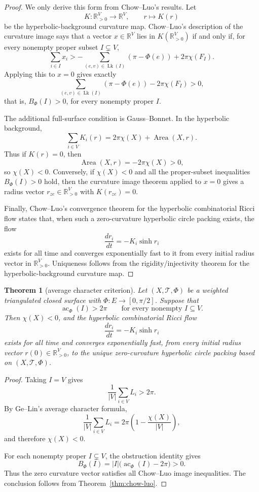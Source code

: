 \documentclass[11pt]{article}
\newtheorem{theorem}{Theorem}
\newcommand{\T}{\mathcal T}
\newcommand{\Phiw}{\Phi}
\newcommand{\R}{\mathbb R}
\newcommand{\Lk}{\operatorname{Lk}}
\newcommand{\ac}{\operatorname{ac}}
\begin{document}
\begin{proof}
We only derive this form from Chow--Luo's results.  Let
\[
  K:\R_{>0}^V\longrightarrow \R^V,\qquad r\longmapsto K(r)
\]
be the hyperbolic-background curvature map.  Chow--Luo's description of
the curvature image says that a vector $x\in\R^V$ lies in $K(\R_{>0}^V)$
if and only if, for every nonempty proper subset $I\subsetneq V$,
\[
  \sum_{i\in I}x_i
  >
  -\sum_{(e,v)\in\Lk(I)}(\pi-\Phiw(e))+2\pi\chi(F_I).
\]
Applying this to $x=0$ gives exactly
\[
  \sum_{(e,v)\in\Lk(I)}(\pi-\Phiw(e))-2\pi\chi(F_I)>0,
\]
that is, $B_\Phi(I)>0$, for every nonempty proper $I$.

The additional full-surface condition is Gauss--Bonnet.  In the hyperbolic
background,
\[
  \sum_{i\in V}K_i(r)=2\pi\chi(X)+\operatorname{Area}(X,r).
\]
Thus if $K(r)=0$, then
\[
  \operatorname{Area}(X,r)=-2\pi\chi(X)>0,
\]
so $\chi(X)<0$.  Conversely, if $\chi(X)<0$ and all the proper-subset
inequalities $B_\Phi(I)>0$ hold, then the curvature image theorem applied
to $x=0$ gives a radius vector $r_{ze}\in\R_{>0}^V$ with $K(r_{ze})=0$.

Finally, Chow--Luo's convergence theorem for the hyperbolic combinatorial
Ricci flow states that, when such a zero-curvature hyperbolic circle
packing exists, the flow
\[
  \frac{dr_i}{dt}=-K_i\sinh r_i
\]
exists for all time and converges exponentially fast to it from every
initial radius vector in $\R_{>0}^V$.  Uniqueness follows from the
rigidity/injectivity theorem for the hyperbolic-background curvature map.
\end{proof}

\begin{theorem}[average character criterion]
Let $(X,\T,\Phiw)$ be a weighted triangulated closed surface with
$\Phiw:E\to[0,\pi/2]$.  Suppose that
\[
  \ac_\Phi(I)>2\pi
  \qquad
  \text{for every nonempty } I\subseteq V .
\]
Then $\chi(X)<0$, and the hyperbolic combinatorial Ricci flow
\[
  \frac{dr_i}{dt}=-K_i\sinh r_i
\]
exists for all time and converges exponentially fast, from every initial
radius vector $r(0)\in\R_{>0}^{V}$, to the unique zero-curvature
hyperbolic circle packing based on $(X,\T,\Phiw)$.
\end{theorem}

\begin{proof}
Taking $I=V$ gives
\[
  \frac{1}{|V|}\sum_{i\in V}L_i>2\pi.
\]
By Ge--Lin's average character formula,
\[
  \frac{1}{|V|}\sum_{i\in V}L_i
  =
  2\pi\left(1-\frac{\chi(X)}{|V|}\right),
\]
and therefore $\chi(X)<0$.

For each nonempty proper $I\subsetneq V$, the obstruction identity gives
\[
  B_\Phi(I)=|I|\bigl(\ac_\Phi(I)-2\pi\bigr)>0.
\]
Thus the zero curvature vector satisfies all Chow--Luo image inequalities.
The conclusion follows from Theorem~\ref{thm:chow-luo}.
\end{proof}
\end{document}
